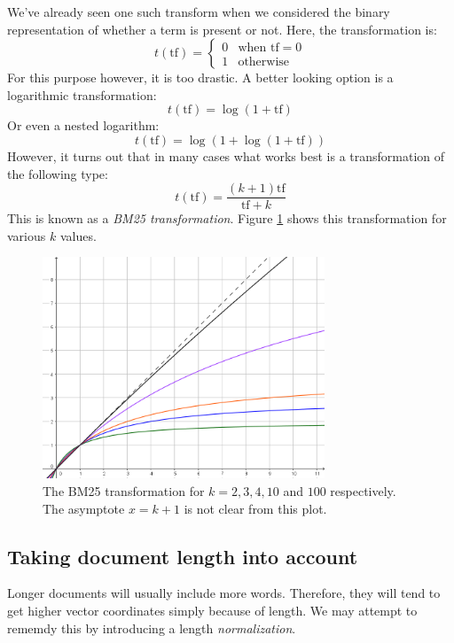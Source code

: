 \documentclass[12pt, a4paper]{article}
\numberwithin{equation}{section}
\begin{document}
We've already seen one such transform when we considered the binary representation of whether a term is present or not. Here, the transformation is:
\begin{equation}
t(\textrm{tf})=
\begin{cases}
0 & \textrm{when }\textrm{tf}=0 \\
1 & \textrm{otherwise}
\end{cases}
\end{equation}
For this purpose however, it is too drastic. A better looking option is a logarithmic transformation:
\begin{equation}
t(\textrm{tf})=\log(1+\textrm{tf})
\end{equation}
Or even a nested logarithm:
\begin{equation}
t(\textrm{tf})=\log(1+\log(1+\textrm{tf}))
\end{equation}
However, it turns out that in many cases what works best is a transformation of the following type:
\begin{equation}
t(\textrm{tf})=\frac{(k+1)\textrm{tf}}{\textrm{tf}+k}
\end{equation}
This is known as a \textit{BM25 transformation}. Figure \ref{fig:bm25} shows this transformation for various $k$ values.

\begin{figure}
\centering
\includegraphics[width=0.75\textwidth]{bm25}
\caption{The BM25 transformation for $k=2, 3, 4, 10$ and $100$ respectively. The asymptote $x=k+1$ is not clear from this plot.}
\label{fig:bm25}
\end{figure}

\subsection{Taking document length into account}
Longer documents will usually include more words. Therefore, they will tend to get higher vector coordinates simply because of length. We may attempt to rememdy this by introducing a length \textit{normalization}.
\end{document}
